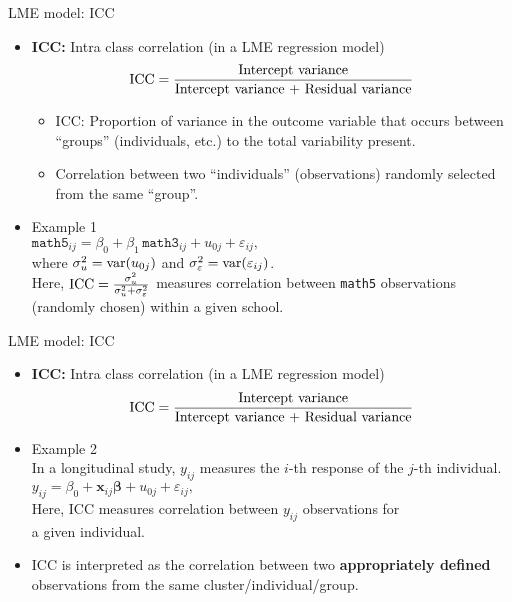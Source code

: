 \documentclass{beamer}
\begin{document}
\begin{frame}{LME model: ICC}
\begin{itemize}
\item \textbf{ICC:} Intra class correlation (in a LME regression model) \qquad
$$ \textnormal{ICC}=\frac{\textnormal{Intercept variance}}{\textnormal{Intercept variance + Residual variance}} $$
\begin{itemize}
    \item ICC: Proportion of variance in the outcome variable that occurs between ``groups'' (individuals, etc.) to the total variability present.
    \item Correlation between two ``individuals'' (observations) randomly selected from the same ``group''.
\end{itemize}
\medskip
\item Example 1\\ \medskip
$\texttt{math5}_{ij} = \beta_{0} + \beta_1 \, \texttt{math3}_{ij} + u_{0j} + \varepsilon_{ij},$\\ \medskip
where $\sigma^2_u = \textnormal{var}(u_{0j})$ and $\sigma^2_{\varepsilon} = \textnormal{var}(\varepsilon_{ij})$.\\ \smallskip
Here, $\textnormal{ICC}=\frac{\sigma^2_u}{\sigma^2_u + \sigma^2_{\varepsilon}}$  measures correlation between \texttt{math5}  observations (randomly chosen) within a given school.
\end{itemize}
\end{frame}
\begin{frame}{LME model: ICC}
\begin{itemize}
\item \textbf{ICC:} Intra class correlation (in a LME regression model) \qquad
$$ \textnormal{ICC}=\frac{\textnormal{Intercept variance}}{\textnormal{Intercept variance + Residual variance}} $$
\medskip
\item Example 2\\ \medskip
In a longitudinal study, $y_{ij}$ measures the $i$-th response of the $j$-th individual. \\ \medskip
$y_{ij} = \beta_{0} + \bm{x}_{ij} \bm{\beta} + u_{0j} + \varepsilon_{ij},$\\ \medskip
Here, ICC measures correlation between $y_{ij}$  observations for \\a given individual.
\medskip
\item ICC is interpreted as the correlation between two \textbf{appropriately defined} observations from the same cluster/individual/group. 
\end{itemize}
\end{frame}
\end{document}
